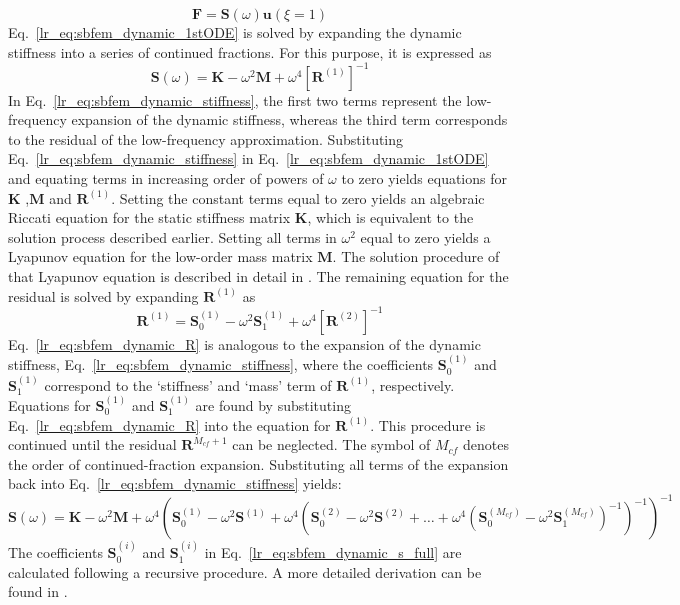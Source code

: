 \begin{equation}
    \mathbf{F} = \mathbf{S}(\omega) \mathbf{u}(\xi=1)
    \label{lr_eq:sbfem_dynamic_nodal_force}
\end{equation}
%
Eq.~\ref{lr_eq:sbfem_dynamic_1stODE} is solved by expanding the dynamic stiffness into a series of continued fractions.
For this purpose, it is expressed as
\begin{equation}
    \mathbf{S}(\omega) = \mathbf{K} - \omega^2 \mathbf{M} + \omega^4 \left[
        \mathbf{R}^{(1)}    
    \right]^{-1}
    \label{lr_eq:sbfem_dynamic_stiffness}
\end{equation}
%
In Eq.~\ref{lr_eq:sbfem_dynamic_stiffness}, the first two terms represent the low-frequency expansion of the dynamic stiffness, whereas the third term corresponds to the residual of the low-frequency approximation.
Substituting Eq.~\ref{lr_eq:sbfem_dynamic_stiffness} in Eq.~\ref{lr_eq:sbfem_dynamic_1stODE} and equating terms in increasing order of powers of $\omega$ to zero yields equations for $\mathbf{K}$ ,$\mathbf{M}$  and $\mathbf{R}^{(1)}$.
Setting the constant terms equal to zero yields an algebraic Riccati equation for the static stiffness matrix $\mathbf{K}$, which is equivalent to the solution process described earlier.
Setting all terms in $\omega^2$ equal to zero yields a Lyapunov equation for the low-order mass matrix $\mathbf{M}$.
The solution procedure of that Lyapunov equation is described in detail in \citep{Son1997}.
The remaining equation for the residual is solved by expanding  $\mathbf{R}^{(1)}$ as
\begin{equation}
    \mathbf{R}^{(1)} = \mathbf{S}_0^{(1)} - \omega^2 \mathbf{S}_1^{(1)} + \omega^4 [\mathbf{R}^{(2)}]^{-1}
    \label{lr_eq:sbfem_dynamic_R}
\end{equation}
%
Eq.~\ref{lr_eq:sbfem_dynamic_R} is analogous to the expansion of the dynamic stiffness, Eq.~\ref{lr_eq:sbfem_dynamic_stiffness}, where the coefficients $\mathbf{S}^{(1)}_0$ and $\mathbf{S}^{(1)}_1$ correspond to the `stiffness' and `mass' term of $\mathbf{R}^{(1)}$, respectively.
Equations for $\mathbf{S}^{(1)}_0$ and $\mathbf{S}^{(1)}_1$ are found by substituting Eq.~\ref{lr_eq:sbfem_dynamic_R} into the equation for $\mathbf{R}^{(1)}$.
This procedure is continued until the residual $\mathbf{R}^{M_{cf}+1}$ can be neglected.
The symbol of $M_{cf}$ denotes the order of continued-fraction expansion.
Substituting all terms of the expansion back into Eq.~\ref{lr_eq:sbfem_dynamic_stiffness} yields:
\begin{dmath}
    \mathbf{S}(\omega) =    \mathbf{K} - \omega^2 \mathbf{M} + \omega^4 \left(
                                \mathbf{S}_0^{(1)} - \omega^2 \mathbf{S}^{(1)} + \omega^4 \left(
                                    \mathbf{S}_0^{(2)} - \omega^2 \mathbf{S}^{(2)} + \dots + 
                                    \omega^4 \left(
                                        \mathbf{S}_0^{(M_{cf})} - \omega^2 \mathbf{S}_1^{(M_{cf})}
                                    \right)^{-1}
                                \right)^{-1}
                            \right)^{-1}
\label{lr_eq:sbfem_dynamic_s_full}
\end{dmath}
%
The coefficients $\mathbf{S}^{(i)}_0$ and $\mathbf{S}^{(i)}_1$ in Eq.~\ref{lr_eq:sbfem_dynamic_s_full} are calculated following a recursive procedure.
A more detailed derivation can be found in \citep{Song2009}.